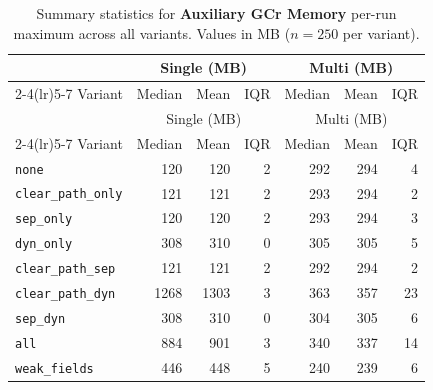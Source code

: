 \begin{longtable}{l rrr rrr}
\caption[Auxiliary GCr memory summary statistics]{Summary statistics for \textbf{Auxiliary GCr Memory} per-run maximum across all variants. Values in MB ($n=250$ per variant).}\label{tab:stats-memory-aux} \\
\toprule
 & \multicolumn{3}{c}{Single (MB)} & \multicolumn{3}{c}{Multi (MB)} \\
\cmidrule(lr){2-4}\cmidrule(lr){5-7}
Variant & Median & Mean & IQR & Median & Mean & IQR \\
\midrule
\endfirsthead
\toprule
 & \multicolumn{3}{c}{Single (MB)} & \multicolumn{3}{c}{Multi (MB)} \\
\cmidrule(lr){2-4}\cmidrule(lr){5-7}
Variant & Median & Mean & IQR & Median & Mean & IQR \\
\midrule
\endhead
\bottomrule
\endfoot
\texttt{none} & 120 & 120 & 2 & 292 & 294 & 4 \\
\texttt{clear\_path\_only} & 121 & 121 & 2 & 293 & 294 & 2 \\
\texttt{sep\_only} & 120 & 120 & 2 & 293 & 294 & 3 \\
\texttt{dyn\_only} & 308 & 310 & 0 & 305 & 305 & 5 \\
\texttt{clear\_path\_sep} & 121 & 121 & 2 & 292 & 294 & 2 \\
\texttt{clear\_path\_dyn} & 1268 & 1303 & 3 & 363 & 357 & 23 \\
\texttt{sep\_dyn} & 308 & 310 & 0 & 304 & 305 & 6 \\
\texttt{all} & 884 & 901 & 3 & 340 & 337 & 14 \\
\texttt{weak\_fields} & 446 & 448 & 5 & 240 & 239 & 6 \\
\end{longtable}
